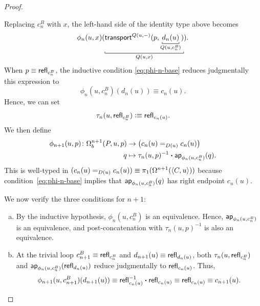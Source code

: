 \begin{proof}
\begin{description}[font=\normalfont\scshape]
        Replacing $c_n^B$ with $x$, the left-hand side of the identity type above becomes
        \[
            \phi_n(u,x)(
                \explain[Q(u,x)]{\fun{transport}^{Q(u,\dummy)}
                    (
                        p,
                        \explain[Q(u,c_n^B)]{d_n(u)}
                    )
                }
            ).
        \]
        When $p\equiv\mathsf{refl}_{c_n^B}$, the inductive condition \eqref{eq:phi-n-base} reduces judgmentally this expression to
        \[
            \phi_n(u,c_n^B)(d_n(u))\equiv c_n(u).
        \]
        Hence, we can set
        \[
            \tau_n(u,\mathsf{refl}_{c_n^B})
                \mathrel{\vcentcolon}\equiv\mathsf{refl}_{c_n(u)}.
        \]
        We then define
        \begin{equation}\label{eq:phi_(n+1)}
        \begin{aligned}
            \phi_{n+1}(u,p)\colon
            \Omega^{n+1}_b(P,u,p)
            &\to
            \bigl(c_n(u)\eq{D(u)}c_n(u)\bigr)\\
            q&\mapsto
                \tau_n(u,p)^{-1}
                \ct
                \fun{ap}_{\phi_n(u,c_n^B)}(q).
        \end{aligned}
        \end{equation}
        This is well-typed in $(c_n(u)\mathrel{=_{D(u)}}c_n(u))\equiv\pi_1(\Omega^{n+1}(\langle C,u\rangle))$ because condition~\eqref{eq:phi-n-base} implies that $\mathsf{ap}_{\phi_n(u,c_n^B)}(q)$ has right endpoint $c_n(u)$.

        We now verify the three conditions for $n+1$:
        \begin{enumerate}[a),font=\upshape]
            \item By the inductive hypothesis, $\phi_n(u,c_n^B)$ is an equivalence. Hence, $\mathsf{ap}_{\phi_n(u,c_n^B)}$ is an equivalence, and post-concatenation with $\tau_n(u,p)^{-1}$ is also an equivalence.

            \item At the trivial loop $c_{n+1}^B\equiv\mathsf{refl}_{c_n^B}$ and $d_{n+1}(u)\equiv\mathsf{refl}_{d_n(u)}$, both $\tau_n(u,\mathsf{refl}_{c_n^B})$ and $\mathsf{ap}_{\phi_n(u,c_n^B)}(\mathsf{refl}_{d_n(u)})$ reduce judgmentally to $\mathsf{refl}_{c_n(u)}$. Thus,
            \[
                \phi_{n+1}(u,c_{n+1}^B)(d_{n+1}(u)) \equiv \mathsf{refl}_{c_n(u)}^{-1}\mathbin{\boldsymbol{\cdot}}\mathsf{refl}_{c_n(u)} \equiv \mathsf{refl}_{c_n(u)} \equiv c_{n+1}(u).
            \]


\end{enumerate}
\end{description}
\end{proof}
